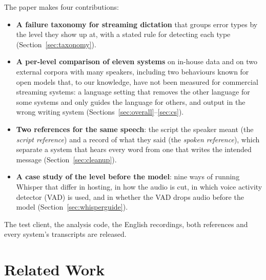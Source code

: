 \documentclass[11pt]{article}
\begin{document}
The paper makes four contributions:
\begin{itemize}\itemsep0pt
  \item \textbf{A failure taxonomy for streaming dictation} that groups error types by the level they show up at, with a stated rule for detecting each type (Section~\ref{sec:taxonomy}).
  \item \textbf{A per-level comparison of eleven systems} on in-house data and on two external corpora with many speakers, including two behaviours known for open models \citep{peng2023prompting,rahman2026scriptcollapse,azeemi2026southasian} that, to our knowledge, have not been measured for commercial streaming systems: a language setting that removes the other language for some systems and only guides the language for others, and output in the wrong writing system (Sections~\ref{sec:overall}--\ref{sec:cs}).
  \item \textbf{Two references for the same speech}: the script the speaker meant (the \emph{script reference}) and a record of what they said (the \emph{spoken reference}), which separate a system that hears every word from one that writes the intended message (Section~\ref{sec:cleanup}).
  \item \textbf{A case study of the level before the model}: nine ways of running Whisper that differ in hosting, in how the audio is cut, in which voice activity detector (VAD) is used, and in whether the VAD drops audio before the model (Section~\ref{sec:whisperguide}).
\end{itemize}
The test client, the analysis code, the English recordings, both references and every system's transcripts are released.

\FloatBarrier
\section{Related Work}\label{sec:related}
\end{document}
